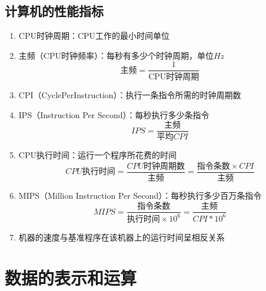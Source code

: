 \documentclass[a4paper,12pt]{article}
\begin{document}
    \subsection{计算机的性能指标}

    \begin{enumerate}
        \item CPU时钟周期：CPU工作的最小时间单位
        \item 主频（CPU时钟频率）：每秒有多少个时钟周期，单位$Hz$
        \[
            \text{主频} = \dfrac{1}{\text{CPU时钟周期}}
        \]
        \item CPI（CyclePerInstruction）：执行一条指令所需的时钟周期数
        \item IPS（Instruction Per Second）：每秒执行多少条指令
        \[
            IPS = \dfrac{\text{主频}}{\text{平均}CPI}
        \]
        \item CPU执行时间：运行一个程序所花费的时间
        \[
            CPU\text{执行时间} = \dfrac{CPU\text{时钟周期数}}{\text{主频}} = \dfrac{\text{指令条数}\times CPI}{\text{主频}}
        \]
        \item MIPS（Million Instruction Per Second）：每秒执行多少百万条指令
        \[
            MIPS = \dfrac{\text{指令条数}}{\text{执行时间}\times 10^6} = \dfrac{\text{主频}}{CPI * 10^6}
        \]
        \item 机器的速度与基准程序在该机器上的运行时间呈相反关系
    \end{enumerate}


    \section{数据的表示和运算}
\end{document}
